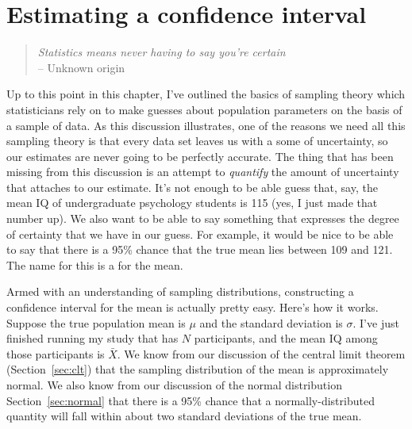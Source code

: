 \section{Estimating a confidence interval\label{sec:ci}}


\begin{quote}
{\it Statistics means never having to say you're certain} \\ \hspace*{2cm} -- Unknown origin
\end{quote}

Up to this point in this chapter, I've outlined the basics of sampling theory which statisticians rely on to make guesses about population parameters on the basis of a sample of data. As this discussion illustrates, one of the reasons we need all this sampling theory is that every data set leaves us with a some of uncertainty, so our estimates are never going to be perfectly accurate. The thing that has been missing from this discussion is an attempt to {\it quantify} the amount of uncertainty that attaches to our estimate. It's not enough to be able guess that, say, the mean IQ of undergraduate psychology students is 115 (yes, I just made that number up). We also want to be able to say something that expresses the degree of certainty that we have in our guess. For example, it would be nice to be able to say that there is a 95\% chance that the true mean lies between 109 and 121. The name for this is a  for the mean.

Armed with an understanding of sampling distributions, constructing a confidence interval for the mean is actually pretty easy. Here's how it works. Suppose the true population mean is $\mu$ and the standard deviation is $\sigma$. I've just finished running my study that has $N$ participants, and the mean IQ among those participants is $\bar{X}$. We know from our discussion of the central limit theorem (Section~\ref{sec:clt}) that the sampling distribution of the mean is approximately normal. We also know from our discussion of the normal distribution Section~\ref{sec:normal} that there is a 95\% chance that a normally-distributed quantity will fall within about two standard deviations of the true mean. 

